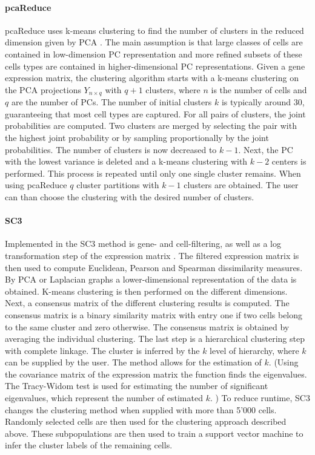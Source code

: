 \documentclass[11pt, a4paper]{article}\usepackage[]{graphicx}\usepackage[]{color}
\begin{document}
\paragraph{pcaReduce}
pcaReduce uses k-means clustering to find the number of clusters in the reduced dimension given by PCA \citep{yau2016pcareduce}. The main assumption is that large classes of cells are contained in low-dimension PC representation and more refined subsets of these cells types are contained in higher-dimensional PC representations. Given a gene expression matrix, the clustering algorithm starts with a k-means clustering on the PCA projections $Y_{n\times q}$ with $q+1$ clusters, where $n$ is the number of cells and $q$ are the number of PCs. The number of initial clusters $k$ is typically around 30,  guaranteeing that most cell types are captured. For all pairs of clusters, the joint probabilities are computed. Two clusters are merged by selecting the pair with the highest joint probability or by sampling proportionally by the joint probabilities. The number of clusters is now decreased to $k-1$. Next, the PC with the lowest variance is deleted and a k-means clustering with $k-2$ centers is performed. This process is repeated until only one single cluster remains. When using pcaReduce $q$ cluster partitions with $k-1$ clusters are obtained. The user can than choose the clustering with the desired number of clusters.
\paragraph{SC3}
Implemented in the SC3 method is gene- and cell-filtering, as well as a log transformation step of the expression matrix \citep{kiselev2017sc3}. The filtered expression matrix is then used to compute  Euclidean, Pearson and  Spearman dissimilarity measures. By PCA or Laplacian graphs a lower-dimensional representation of the data is obtained.  K-means clustering is then performed on the different dimensions. Next, a consensus matrix of the different clustering results is computed. The consensus matrix is a binary similarity matrix with entry one if two cells belong to the same cluster and zero otherwise. The consensus matrix is obtained by averaging the individual clustering. The last step is a hierarchical clustering step with complete linkage. The cluster is inferred by the $k$ level of hierarchy, where $k$ can be supplied by the user. The method allows for the estimation of $k$. (Using the covariance matrix of the expression matrix the function finds the eigenvalues. The Tracy-Widom test is used for estimating the number of significant eigenvalues, which represent the number of estimated $k$. )
To reduce runtime, SC3 changes the clustering method when supplied with more than 5'000 cells. Randomly selected cells are then used for the clustering approach described above. These subpopulations are then used to train a support vector machine to infer the cluster labels of the remaining cells.
\end{document}
